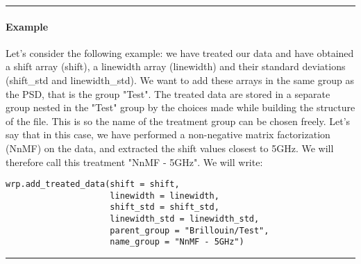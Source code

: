 \begin{center}
    \rule{15cm}{0.4pt}
\end{center}

\paragraph{Example}
Let's consider the following example: we have treated our data and have obtained a shift array (shift), a linewidth array (linewidth) and their standard deviations (shift\_std and linewidth\_std). We want to add these arrays in the same group as the PSD, that is the group "Test". The treated data are stored in a separate group nested in the "Test" group by the choices made while building the structure of the file. This is so the name of the treatment group can be chosen freely. Let's say that in this case, we have performed a non-negative matrix factorization (NnMF) on the data, and extracted the shift values closest to 5GHz. We will therefore call this treatment "NnMF - 5GHz". We will write:
\begin{lstlisting}
wrp.add_treated_data(shift = shift,
                     linewidth = linewidth,
                     shift_std = shift_std,
                     linewidth_std = linewidth_std,
                     parent_group = "Brillouin/Test", 
                     name_group = "NnMF - 5GHz")
\end{lstlisting}

\begin{center}
    \rule{15cm}{0.4pt}
\end{center}